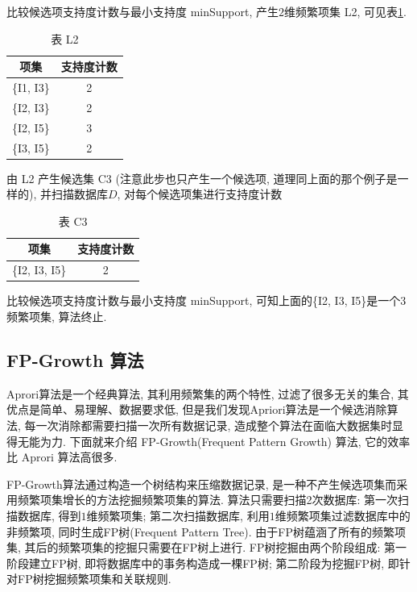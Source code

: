 \documentclass[a4paper,UTF8]{ctexart}
\theoremstyle{plain} \newtheorem{theorem}{定理}[section]
\theoremstyle{plain} \newtheorem{definition}{定义}[section]
\theoremstyle{plain} \newtheorem{lemma}{引理}[section]
\theoremstyle{plain} \newtheorem{proposition}{命题}[section]
\theoremstyle{plain} \newtheorem{example}{例}[section]
\theoremstyle{plain} \newtheorem{remark}{注}[section]
\theoremstyle{plain} \newtheorem{corollary}{推论}[section]
\begin{document}
比较候选项支持度计数与最小支持度 minSupport, 产生$2$维频繁项集 L2, 可见表\ref{l2}.
\begin{table}[!htb]
\centering
\caption{表 L2}
\label{l2}
\begin{tabular}{c|c}
	\hline
    \textbf{项集} & \textbf{支持度计数}  \\
    \hline
    \{I1, I3\}   &   2  \\
    \hline
    \{I2, I3\}   &   2  \\
    \hline
    \{I2, I5\}   &   3  \\
    \hline
    \{I3, I5\}   &   2  \\
	\hline
\end{tabular}
\end{table}

由 L2 产生候选集 C3 ({\color{red}注意此步也只产生一个候选项, 道理同上面的那个例子是一样的}), 并扫描数据库$D$, 对每个候选项集进行支持度计数
\begin{table}[!htb]
\centering
\caption{表 C3}
\label{c3}
\begin{tabular}{c|c}
	\hline
    \textbf{项集} & \textbf{支持度计数}  \\
    \hline
    \{I2, I3, I5\}   &  2  \\
	\hline
\end{tabular}
\end{table}

比较候选项支持度计数与最小支持度 minSupport, 可知上面的\{I2, I3, I5\}是一个$3$频繁项集, 算法终止.


\subsection{FP-Growth 算法}
Aprori算法是一个经典算法, 其利用频繁集的两个特性, 过滤了很多无关的集合, 其优点是简单、易理解、数据要求低, 但是我们发现Apriori算法是一个候选消除算法, 每一次消除都需要扫描一次所有数据记录, 造成整个算法在面临大数据集时显得无能为力. 下面就来介绍 FP-Growth(Frequent Pattern Growth) 算法, 它的效率比 Aprori 算法高很多. 

FP-Growth算法通过构造一个树结构来压缩数据记录, 是一种不产生候选项集而采用频繁项集增长的方法挖掘频繁项集的算法. 算法只需要扫描2次数据库: 第一次扫描数据库, 得到$1$维频繁项集; 第二次扫描数据库, 利用$1$维频繁项集过滤数据库中的非频繁项, 同时生成FP树(Frequent Pattern Tree). 由于FP树蕴涵了所有的频繁项集, 其后的频繁项集的挖掘只需要在FP树上进行. FP树挖掘由两个阶段组成: 第一阶段建立FP树, 即将数据库中的事务构造成一棵FP树; 第二阶段为挖掘FP树, 即针对FP树挖掘频繁项集和关联规则.
\end{document}
